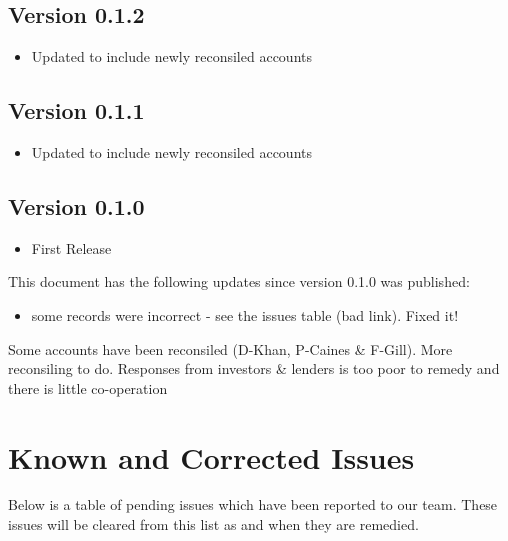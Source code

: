 \documentclass[letterpaper,10pt,openany,oneside,english]{sphinxmanual}
\begin{document}
\subsection{Version 0.1.2}
\label{\detokenize{releasenotes:version-0-1-2}}\begin{itemize}
\item {} 
Updated to include newly reconsiled accounts

\end{itemize}


\subsection{Version 0.1.1}
\label{\detokenize{releasenotes:version-0-1-1}}\begin{itemize}
\item {} 
Updated to include newly reconsiled accounts

\end{itemize}


\subsection{Version 0.1.0}
\label{\detokenize{releasenotes:version-0-1-0}}\begin{itemize}
\item {} 
First Release

\end{itemize}

This document has the following updates since version 0.1.0 was published:
\begin{itemize}
\item {} 
some records were incorrect - see the issues table (bad link). Fixed it!

\end{itemize}

Some accounts have been reconsiled (D-Khan, P-Caines \& F-Gill).
More reconsiling to do. Responses from investors \& lenders is too poor to remedy and there is little co-operation


\section{Known and Corrected Issues}
\label{\detokenize{releasenotes:known-and-corrected-issues}}
Below is a table of pending issues which have been reported to our team.
These issues will be cleared from this list as and when they are remedied.
\end{document}
